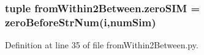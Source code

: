 \hypertarget{namespacefrom_within2_between_a0f4d3ac33db22359da335b2db8cece7f}{
\subsubsection[{zero\-S\-I\-M}]{\setlength{\rightskip}{0pt plus 5cm}tuple from\-Within2\-Between.\-zero\-S\-I\-M = {\bf zero\-Before\-Str\-Num}({\bf i},num\-Sim)}}\label{namespacefrom_within2_between_a0f4d3ac33db22359da335b2db8cece7f}


Definition at line 35 of file from\-Within2\-Between.\-py.

